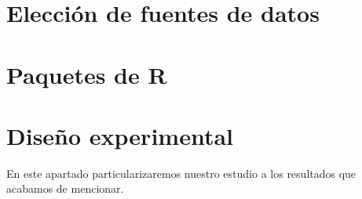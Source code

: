 \section{Elección de fuentes de datos}

\section{Paquetes de R}

\section{Diseño experimental}
En este apartado particularizaremos nuestro estudio a los resultados que acabamos de mencionar. 